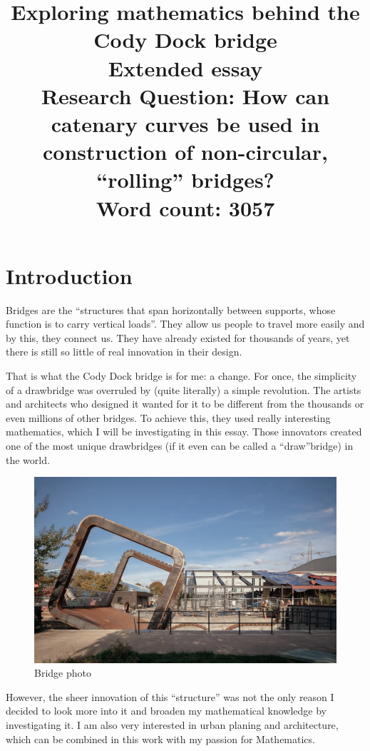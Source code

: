 \documentclass[12pt]{article}
\title{Exploring mathematics behind the Cody Dock bridge \\
    \large Extended essay \\
    \normalsize Research Question: How can catenary curves be used in construction of non-circular, ``rolling'' bridges? \\
    \vspace{12pt} Word count: 3057}
\date{}
\author{}
\begin{document}
    \maketitle
    \newpage
    \tableofcontents
    \newpage
    
    \section{Introduction}

        Bridges are the ``structures that span horizontally between supports, whose function is to carry vertical loads''\cite{bridge_encyplopedia}. They allow us people to travel more easily and by this, they connect us. They have already existed for thousands of years, yet there is still so little of real innovation in their design.
    
        That is what the Cody Dock bridge is for me: a change. For once, the simplicity of a drawbridge was overruled by (quite literally) a simple revolution. The artists and architects who designed it wanted for it to be different from the thousands or even millions of other bridges. To achieve this, they used really interesting mathematics, which I will be investigating in this essay. Those innovators created one of the most unique drawbridges (if it even can be called a ``draw''bridge) in the world.

        \begin{figure}[H]
            \centering
            \includegraphics[width=0.75\linewidth]{images/bridge.png}
            \caption[Bridge photo]{Bridge photo\footnotemark}\label{fig:bridge_photo}
        \end{figure}

        However, the sheer innovation of this ``structure'' was not the only reason I decided to look more into it and broaden my mathematical knowledge by investigating it. I am also very interested in urban planing and architecture, which can be combined in this work with my passion for Mathematics.
\end{document}
